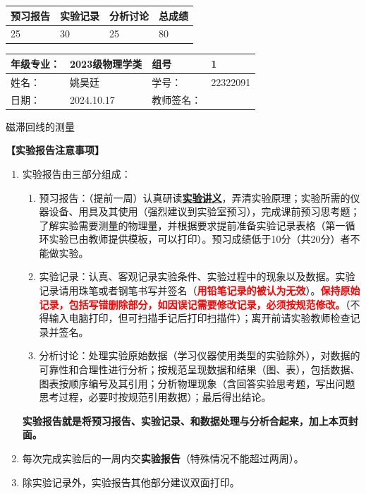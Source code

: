 \documentclass[dvipsnames, svgnames,a4paper,11pt]{article}
\begin{document}
\begin{table}
	\renewcommand\arraystretch{1.7}
	\begin{tabularx}{\textwidth}{
		|X|X|X|X
		|X|X|X|X|}
	\hline
	\multicolumn{2}{|c|}{预习报告}&\multicolumn{2}{|c|}{实验记录}&\multicolumn{2}{|c|}{分析讨论}&\multicolumn{2}{|c|}{总成绩}\\
	\hline
	 25& &30  & &25  & &80& \\
	\hline
	\end{tabularx}
\end{table}


\begin{table}
	\renewcommand\arraystretch{1.7}
	\begin{tabularx}{\textwidth}{|X|X|X|X|}
	\hline
	年级专业：& 2023级物理学类 &组号& 1\\
	\hline
	姓名：& 姚昊廷  & 学号：&22322091\\
	\hline
	日期：& 2024.10.17& 教师签名：& \\
	\hline
	\end{tabularx}
\end{table}

\begin{center}
	\LARGE 磁滞回线的测量
\end{center}

\textbf{【实验报告注意事项】}
\begin{enumerate}
	\item 实验报告由三部分组成：
	\begin{enumerate}
		\item 预习报告：（提前一周）认真研读\underline{\textbf{实验讲义}}，弄清实验原理；实验所需的仪器设备、用具及其使用（强烈建议到实验室预习），完成课前预习思考题；了解实验需要测量的物理量，并根据要求提前准备实验记录表格（第一循环实验已由教师提供模板，可以打印）。预习成绩低于10分（共20分）者不能做实验。
	    \item 实验记录：认真、客观记录实验条件、实验过程中的现象以及数据。实验记录请用珠笔或者钢笔书写并签名（\textcolor{red}{\textbf{用铅笔记录的被认为无效}}）。\textcolor{red}{\textbf{保持原始记录，包括写错删除部分，如因误记需要修改记录，必须按规范修改。}}（不得输入电脑打印，但可扫描手记后打印扫描件）；离开前请实验教师检查记录并签名。
	    \item 分析讨论：处理实验原始数据（学习仪器使用类型的实验除外），对数据的可靠性和合理性进行分析；按规范呈现数据和结果（图、表），包括数据、图表按顺序编号及其引用；分析物理现象（含回答实验思考题，写出问题思考过程，必要时按规范引用数据）；最后得出结论。
	\end{enumerate}
	\textbf{实验报告就是将预习报告、实验记录、和数据处理与分析合起来，加上本页封面。}
	\item 每次完成实验后的一周内交\textbf{实验报告}（特殊情况不能超过两周）。
	\item 除实验记录外，实验报告其他部分建议双面打印。
\end{enumerate}
\end{document}
